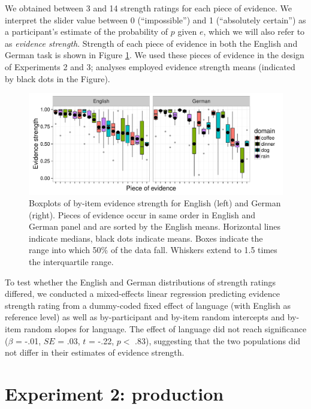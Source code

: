 \documentclass[11pt]{article}
\newcommand{\figref}[1]{Figure \ref{#1}}
\begin{document}
We obtained between 3 and 14 strength ratings for each piece of evidence. We interpret the slider value between 0 (``impossible'') and 1 (``absolutely certain'') as a participant's estimate of the probability of $p$ given $e$, which we will also refer to as  \emph{evidence strength}. Strength of each piece of evidence in both the English and German task is shown in \figref{fig:evidencestrength}.  We used these pieces of evidence in the design of Experiments 2 and 3; analyses employed evidence strength means (indicated by black dots in the Figure).

\begin{figure}
\centering
\includegraphics[width=\textwidth]{pics/evidencestrength-boxplots}
\caption{Boxplots of by-item evidence strength  for English (left) and German (right). Pieces of evidence occur in same order in English and German panel and are sorted by the English means. Horizontal lines indicate medians, black dots indicate means. Boxes indicate the range into which 50\% of the data fall. Whiskers extend to 1.5 times the interquartile range.}
\label{fig:evidencestrength}
\end{figure}


To test whether the English and German distributions of strength ratings differed, we conducted a mixed-effects linear regression predicting evidence strength rating from a dummy-coded fixed effect of language (with English as reference level) as well as by-participant and by-item random intercepts and by-item random slopes for language. The effect of language did not reach significance ($\beta$ = -.01, $SE$ = .03, $t$ = -.22, $p <$ .83), suggesting that the two populations did not differ in their estimates of evidence strength.   

\section{Experiment 2: production}
\end{document}
